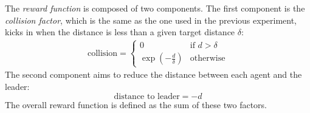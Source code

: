 \documentclass[12pt,a4paper,openright,twoside]{book}
\begin{document}
The \emph{reward function} is composed of two components. The first component is the \emph{collision factor},
    which is the same as the one used in the previous experiment, kicks in when the distance is less than 
    a given target distance $\delta$:
    \begin{equation}
        \label{eq:ftl-collision-factor-eq}
        \begin{split}
            \text{collision} = \begin{cases}
                0 & \text{if } d > \delta \\
                \exp\left(-\frac{d}{\delta}\right) & \text{otherwise}
            \end{cases}
        \end{split}
    \end{equation}
    The second component aims to reduce the distance between each agent and the leader:
    \begin{equation}
        \label{eq:ftl-distance-factor-eq}
        \text{distance to leader} = -d
    \end{equation}
    The overall reward function is defined as the sum of these two factors.
\end{document}
